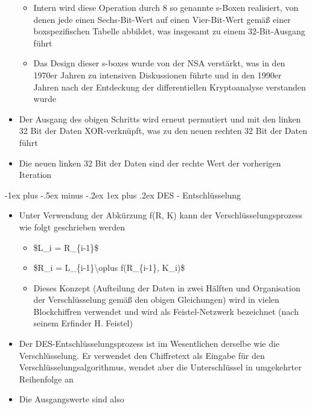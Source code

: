 \documentclass[a4paper]{article}
\makeatletter
\renewcommand{\subsubsection}{\@startsection{subsubsection}{3}{0mm}%
 {-1ex plus -.5ex minus -.2ex}%
 {1ex plus .2ex}%
 {\normalfont\small\bfseries}}
\makeatother
\begin{document}
\begin{multicols}{3}
\begin{itemize}
              \begin{itemize}
                  \item
                        Intern wird diese Operation durch 8 so genannte s-Boxen realisiert,
                        von denen jede einen Sechs-Bit-Wert auf einen Vier-Bit-Wert gemäß
                        einer boxspezifischen Tabelle abbildet, was insgesamt zu einem
                        32-Bit-Ausgang führt
                  \item
                        Das Design dieser s-boxes wurde von der NSA verstärkt, was in den
                        1970er Jahren zu intensiven Diskussionen führte und in den 1990er
                        Jahren nach der Entdeckung der differentiellen Kryptoanalyse
                        verstanden wurde
              \end{itemize}
        \item
              Der Ausgang des obigen Schritts wird erneut permutiert und mit den
              linken 32 Bit der Daten XOR-verknüpft, was zu den neuen rechten 32 Bit
              der Daten führt
        \item
              Die neuen linken 32 Bit der Daten sind der rechte Wert der vorherigen
              Iteration
    \end{itemize}


    \subsubsection{DES - Entschlüsselung}

    \begin{itemize}
        \item
              Unter Verwendung der Abkürzung f(R, K) kann der
              Verschlüsselungsprozess wie folgt geschrieben werden

              \begin{itemize}
                  \item
                        \$L\_i = R\_\{i-1\}\$
                  \item
                        \$R\_i = L\_\{i-1\}\textbackslash oplus f(R\_\{i-1\}, K\_i)\$
                  \item
                        Dieses Konzept (Aufteilung der Daten in zwei Hälften und
                        Organisation der Verschlüsselung gemäß den obigen Gleichungen) wird
                        in vielen Blockchiffren verwendet und wird als Feistel-Netzwerk
                        bezeichnet (nach seinem Erfinder H. Feistel)
              \end{itemize}
        \item
              Der DES-Entschlüsselungsprozess ist im Wesentlichen derselbe wie die
              Verschlüsselung. Er verwendet den Chiffretext als Eingabe für den
              Verschlüsselungsalgorithmus, wendet aber die Unterschlüssel in
              umgekehrter Reihenfolge an
        \item
              Die Ausgangswerte sind also


\end{itemize}
\end{multicols}
\end{document}
